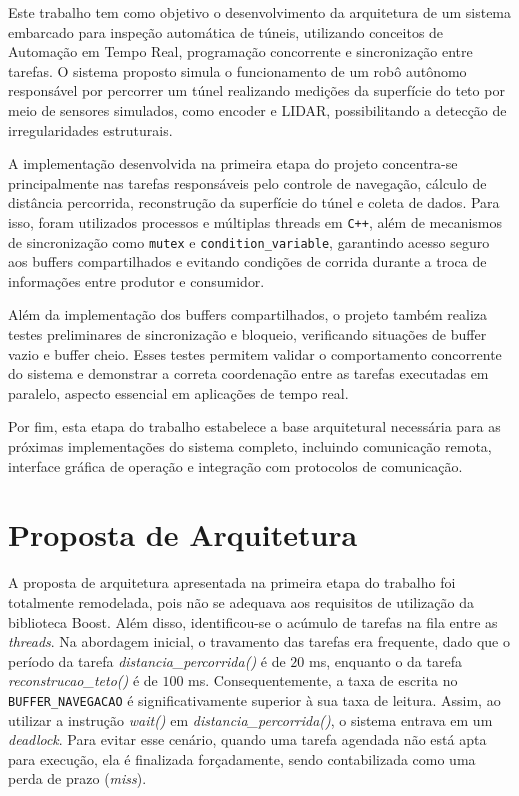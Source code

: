 \documentclass[12pt]{article}
\begin{document}
Este trabalho tem como objetivo o desenvolvimento da arquitetura de um sistema embarcado para inspeção automática de túneis, utilizando conceitos de Automação em Tempo Real, programação concorrente e sincronização entre tarefas. O sistema proposto simula o funcionamento de um robô autônomo responsável por percorrer um túnel realizando medições da superfície do teto por meio de sensores simulados, como encoder e LIDAR, possibilitando a detecção de irregularidades estruturais.

A implementação desenvolvida na primeira etapa do projeto concentra-se principalmente nas tarefas responsáveis pelo controle de navegação, cálculo de distância percorrida, reconstrução da superfície do túnel e coleta de dados. Para isso, foram utilizados processos e múltiplas threads em \texttt{C++}, além de mecanismos de sincronização como \texttt{mutex} e \texttt{condition\_variable}, garantindo acesso seguro aos buffers compartilhados e evitando condições de corrida durante a troca de informações entre produtor e consumidor.

Além da implementação dos buffers compartilhados, o projeto também realiza testes preliminares de sincronização e bloqueio, verificando situações de buffer vazio e buffer cheio. Esses testes permitem validar o comportamento concorrente do sistema e demonstrar a correta coordenação entre as tarefas executadas em paralelo, aspecto essencial em aplicações de tempo real.

Por fim, esta etapa do trabalho estabelece a base arquitetural necessária para as próximas implementações do sistema completo, incluindo comunicação remota, interface gráfica de operação e integração com protocolos de comunicação.

\section{Proposta de Arquitetura}

A proposta de arquitetura apresentada na primeira etapa do trabalho foi totalmente remodelada, pois não se adequava aos requisitos de utilização da biblioteca Boost. Além disso, identificou-se o acúmulo de tarefas na fila entre as \textit{threads}. Na abordagem inicial, o travamento das tarefas era frequente, dado que o período da tarefa \textit{distancia\_percorrida()} é de $20$ ms, enquanto o da tarefa \textit{reconstrucao\_teto()} é de $100$ ms. Consequentemente, a taxa de escrita no \texttt{BUFFER\_NAVEGACAO} é significativamente superior à sua taxa de leitura. Assim, ao utilizar a instrução \textit{wait()} em \textit{distancia\_percorrida()}, o sistema entrava em um \textit{deadlock}. Para evitar esse cenário, quando uma tarefa agendada não está apta para execução, ela é finalizada forçadamente, sendo contabilizada como uma perda de prazo (\textit{miss}).
\end{document}
